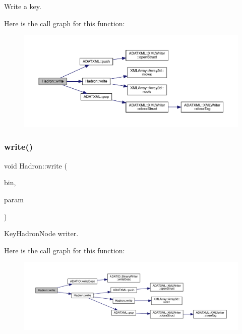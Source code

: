 Write a key. 

Here is the call graph for this function\+:\nopagebreak
\begin{figure}[H]
\begin{center}
\leavevmode
\includegraphics[width=350pt]{d1/daf/namespaceHadron_a9d260315c8fc49d172ff22fd3abb49c9_cgraph}
\end{center}
\end{figure}
\mbox{\label{namespaceHadron_ae47780c59de1d15679cc11611947b313}} 
\subsubsection{\texorpdfstring{write()}{write()}\hspace{0.1cm}{\footnotesize\ttfamily [51/95]}}
{\footnotesize\ttfamily void Hadron\+::write (\begin{DoxyParamCaption}\item[{\mbox{\hyperlink{classADATIO_1_1BinaryWriter}{Binary\+Writer}} \&}]{bin,  }\item[{const \mbox{\hyperlink{structHadron_1_1KeyHadronNode__t_1_1Quark__t}{Key\+Hadron\+Node\+\_\+t\+::\+Quark\+\_\+t}} \&}]{param }\end{DoxyParamCaption})}



Key\+Hadron\+Node writer. 

Here is the call graph for this function\+:\nopagebreak
\begin{figure}[H]
\begin{center}
\leavevmode
\includegraphics[width=350pt]{d1/daf/namespaceHadron_ae47780c59de1d15679cc11611947b313_cgraph}
\end{center}
\end{figure}
\mbox{\label{namespaceHadron_a12ff79f44bd22acfe6be486d4089262e}} 
